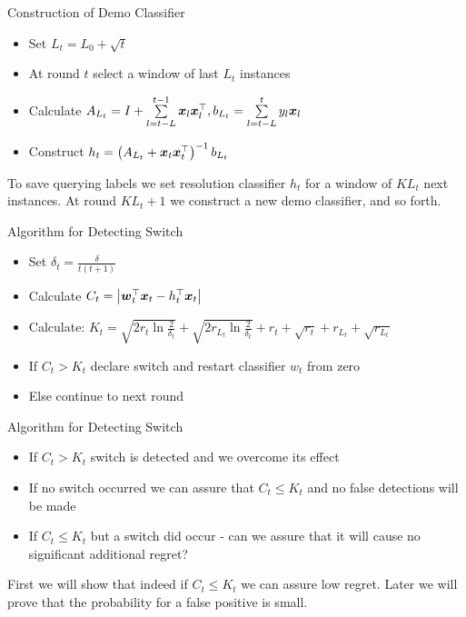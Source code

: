 \documentclass{beamer}
\begin{document}
\begin{frame}{Construction of Demo Classifier}
\begin{itemize}
\item Set $L_t=L_0+\sqrt{t}$
\item At round $t$  select a window of last $L_t$ instances 
\item Calculate $A_{L_t}=I+\sum\limits_{l=t-L}^{t-1}{{\boldsymbol{x}}_{l}{{\boldsymbol{x}}}^{\top}_{l}}, b_{L_t}=\sum\limits_{l=t-L}^{t}y_l{\boldsymbol{x}}_{l}$
\item Construct $h_t=\left(A_{L_t}+{\boldsymbol{x}}_{t}{{\boldsymbol{x}}}^{\top}_{t}\right)^{-1}b_{L_t}$
\end{itemize}
To save querying labels we set resolution classifier $h_t$ for a window of $KL_t$ next instances. At round $KL_t+1$ we construct a new demo classifier, and so forth.
\end{frame}

\begin{frame}{Algorithm for Detecting Switch}
\begin{itemize}
\item Set $\delta_t=\frac{\delta}{t(t+1)}$
\item Calculate $C_t=\left\vert{{\boldsymbol{w}}}^{\top}_{t}{\boldsymbol{x}}_{t}-h_{t}^{\top}{\boldsymbol{x}}_{t}\right\vert$
\item Calculate: \newline \newline $K_t=\sqrt{2r_t\ln{\frac{2}{\delta_t}}}+\sqrt{2r_{L_t}\ln{\frac{2}{\delta_t}}}+r_t+\sqrt{r_t}+r_{L_t}+\sqrt{r_{L_t}}$
\item If $C_t>K_t$ declare switch and restart classifier $w_t$ from zero
\item Else continue to next round
\end{itemize}
\end{frame}


\begin{frame}{Algorithm for Detecting Switch}
\begin{itemize}
\item If $C_t>K_t$ switch is detected and we overcome its effect
\item If no switch occurred we can assure that $C_t\leq K_t$ and no false detections will be made
\item If $C_t\leq K_t$ but a switch did occur - can we assure that it will cause no significant additional regret?
\end{itemize}
First we will show that indeed if $C_t\leq K_t$ we can assure low regret.\newline
Later we will prove that the probability for a false positive is small.
\end{frame}
\end{document}
